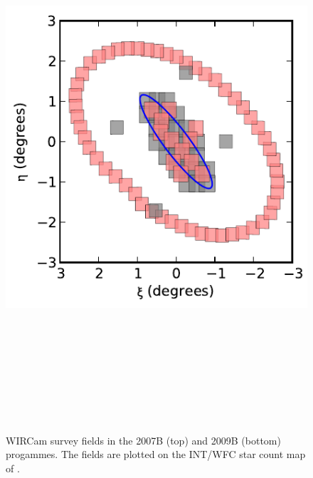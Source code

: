 \documentclass[iop]{emulateapj}
\begin{document}



\begin{figure}[p]
	\centering
		\includegraphics[height=8in]{figs/fieldmap.pdf}
	\caption[WIRCam survey fields]{WIRCam survey fields in the 2007B (top) and 2009B (bottom) progammes. The fields are plotted on the INT/WFC star count map of \cite{Ibata:2005}.}
	\label{fig:fieldmap}
\end{figure}
\end{document}
